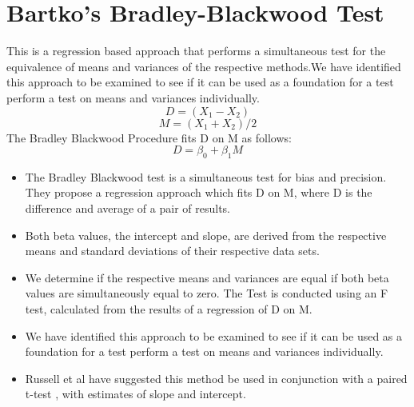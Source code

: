 \documentclass[12pt, a4paper]{report}
\theoremstyle{plain}
\theoremstyle{definition}
\theoremstyle{remark}
\begin{document}
	\section{Bartko's Bradley-Blackwood Test}
	This is a regression based
	approach that performs a simultaneous test for the equivalence of
	means and variances of the respective methods.We have identified
	this approach  to be examined to see if it can be used as a
	foundation for a test perform a test on
	means and variances individually.
	\begin{equation}
	D = (X_{1}-X_{2})
	\end{equation}
	\begin{equation}
	M = (X_{1} + X_{2}) /2
	\end{equation}
	The Bradley Blackwood Procedure fits D on M as follows:\\
	\begin{equation}
	D = \beta_{0} + \beta_{1}M
	\end{equation}
	\begin{itemize}
		\item The Bradley Blackwood test is a simultaneous test for bias and
		precision. They propose a regression approach which fits D on M,
		where D is the difference and average of a pair of results.
		\item Both beta values, the intercept and slope, are derived from the respective means and
		standard deviations of their respective data sets.
		\item We determine if the respective means and variances are equal if
		both beta values are simultaneously equal to zero. The Test is
		conducted using an F test, calculated from the results of a
		regression of D on M.
		\item We have identified this approach  to be examined to see if it can
		be used as a foundation for a test perform a test on means and
		variances individually.
		\item Russell et al have suggested this method be used in conjunction
		with a paired t-test , with estimates of slope and intercept.
	\end{itemize}
	
	
\end{document}
